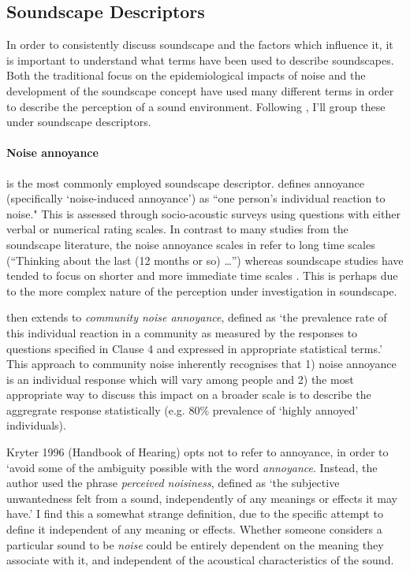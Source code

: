 \subsection{Soundscape Descriptors}
In order to consistently discuss soundscape and the factors which influence it, it is important to understand what terms have been used to describe soundscapes. Both the traditional focus on the epidemiological impacts of noise and the development of the soundscape concept have used many different terms in order to describe the perception of a sound environment. Following \citet{Aletta2016Soundscape}, I'll group these under soundscape descriptors. 

\paragraph{Noise annoyance} is the most commonly employed soundscape descriptor. \citet{ISO15666} defines annoyance (specifically `noise-induced annoyance') as ``one person's individual reaction to noise." This is assessed through socio-acoustic surveys using questions with either verbal or numerical rating scales. In contrast to many studies from the soundscape literature, the noise annoyance scales in \citet{ISO15666} refer to long time scales (``Thinking about the last (12 months or so) \ldots'') whereas soundscape studies have tended to focus on shorter and more immediate time scales . This is perhaps due to the more complex nature of the perception under investigation in soundscape. 

\citet{ISO15666} then extends to \emph{community noise annoyance}, defined as `the prevalence rate of this individual reaction in a community as measured by the responses to questions specified in Clause 4 and expressed in appropriate statistical terms.' This approach to community noise inherently recognises that 1) noise annoyance is an individual response which will vary among people and 2) the most appropriate way to discuss this impact on a broader scale is to describe the aggregrate response statistically (e.g. 80\% prevalence of `highly annoyed' individuals).

Kryter 1996 (Handbook of Hearing) opts not to refer to annoyance, in order to `avoid some of the ambiguity possible with the word \emph{annoyance}. Instead, the author used the phrase \emph{perceived noisiness}, defined as `the subjective unwantedness felt from a sound, independently of any meanings or effects it may have.' I find this a somewhat strange definition, due to the specific attempt to define it independent of any meaning or effects. Whether someone considers a particular sound to be \emph{noise} could be entirely dependent on the meaning they associate with it, and independent of the acoustical characteristics of the sound.


